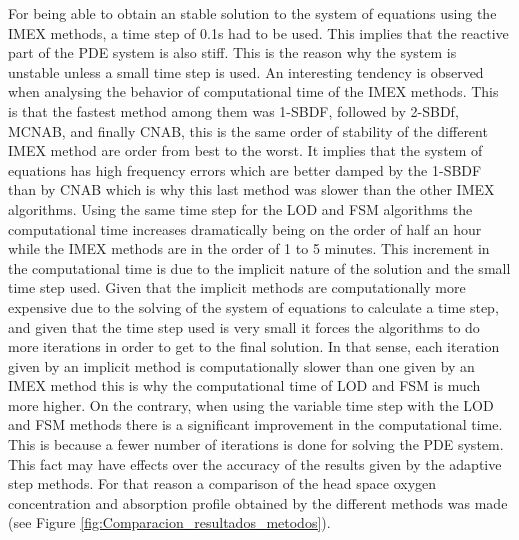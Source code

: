 \begin{refsection}
For being able to obtain an stable solution to the system of equations using the IMEX methods, a time step of 0.1s had to be used. This implies that the reactive part of the PDE system is also stiff. This is the reason why the system is unstable unless a small time step is used. An interesting tendency is observed when analysing the  behavior of computational time of the IMEX methods. This is that the fastest method among them was 1-SBDF, followed by 2-SBDf, MCNAB, and finally CNAB, this is the same order of stability of the different IMEX method are order from best to the worst. It implies that the system of equations has high frequency errors which are better damped by the 1-SBDF than by CNAB which is why this last method was slower than the other IMEX algorithms. Using the same time step for the LOD and FSM algorithms the computational time increases dramatically being on the order of half an hour while the IMEX methods are in the order of 1 to 5 minutes. This increment in the computational time is due to the implicit nature of the solution and the small time step used. Given that the implicit methods are computationally more expensive due to the solving of the system of equations to calculate a time step, and given that the time step used is very small it forces the algorithms to do more iterations in order to get to the final solution. In that sense, each iteration given by an implicit method is computationally slower than one given by an IMEX method this is why the computational time of LOD and FSM is much more higher. On the contrary, when using the variable time step with the LOD and FSM methods there is a significant improvement in the computational time. This is because a fewer number of iterations is done  for solving the PDE system. This fact may have effects over the accuracy of the results given by the adaptive step methods. For that reason a comparison of the head space oxygen concentration and absorption profile obtained by the different methods was made (see Figure \ref{fig:Comparacion_resultados_metodos}).


\end{refsection}
